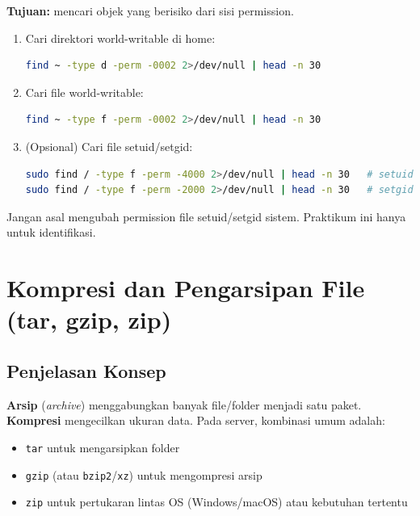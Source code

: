\textbf{Tujuan:} mencari objek yang berisiko dari sisi permission.

\begin{enumerate}
    \item Cari direktori world-writable di home:
\begin{lstlisting}[language=bash, caption={Mencari direktori yang world-writable}]
find ~ -type d -perm -0002 2>/dev/null | head -n 30
\end{lstlisting}

    \item Cari file world-writable:
\begin{lstlisting}[language=bash, caption={Mencari file yang world-writable}]
find ~ -type f -perm -0002 2>/dev/null | head -n 30
\end{lstlisting}

    \item (Opsional) Cari file setuid/setgid:
\begin{lstlisting}[language=bash, caption={Audit setuid/setgid di sistem (butuh sudo)}]
sudo find / -type f -perm -4000 2>/dev/null | head -n 30   # setuid
sudo find / -type f -perm -2000 2>/dev/null | head -n 30   # setgid
\end{lstlisting}
\end{enumerate}

\begin{warningbox}
Jangan asal mengubah permission file setuid/setgid sistem. Praktikum ini hanya untuk identifikasi.
\end{warningbox}

\section{Kompresi dan Pengarsipan File (tar, gzip, zip)}
\label{sec:archive}

\subsection*{Penjelasan Konsep}
\textbf{Arsip} (\textit{archive}) menggabungkan banyak file/folder menjadi satu paket.
\textbf{Kompresi} mengecilkan ukuran data.
Pada server, kombinasi umum adalah:
\begin{itemize}
    \item \texttt{tar} untuk mengarsipkan folder
    \item \texttt{gzip} (atau \texttt{bzip2}/\texttt{xz}) untuk mengompresi arsip
    \item \texttt{zip} untuk pertukaran lintas OS (Windows/macOS) atau kebutuhan tertentu
\end{itemize}

